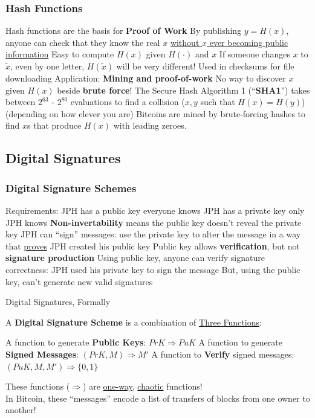 \documentclass[aspectratio=169]{beamer}
\begin{document}
\begin{frame}
\frametitle{Hash Functions}

Hash functions are the basis for \textbf{Proof of Work}
\bi
\m By publishing $y=H(x)$, anyone can check that they know the real $x$ \ul{without $x$ ever becoming public information} \pause 
\bi
\m Easy to compute $H(x)$ given $H(\cdot)$ and $x$ \pause 
\m If someone changes $x$ to $\tilde{x}$, even by one letter, $H(\tilde{x})$ will be very different!
\m Used in checksums for file downloading \pause 
\ei
\m Application: \textbf{Mining and proof-of-work}
\bi 
\m No way to discover $x$ given $H(x)$ beside \textbf{brute force}! \pause 
\m The Secure Hash Algorithm 1 (``\textbf{SHA1}'') takes between $2^{63}$ - $2^{80}$ evaluations to find a collision ($x,y$ such that $H(x)=H(y)$) (depending on how clever you are) \pause 
\m Bitcoins are mined by brute-forcing hashes to find $x$s that produce $H(x)$ with leading zeroes. 
\ei 
\ei

\end{frame}

\subsection{Digital Signatures}

\begin{frame}
\frametitle{Digital Signature Schemes}

Requirements:
\bi
\m JPH has a public key everyone knows
\m JPH has a private key only JPH knows
\bi 
\m \textbf{Non-invertability} means the public key doesn't reveal the private key \pause 
\ei 
\m JPH can ``sign'' messages: use the private key to alter the message in a way that \ul{proves} JPH created his public key 
\m Public key allows \textbf{verification}, but not \textbf{signature production} \pause 
\bi
\m Using public key, anyone can verify signature correctness: JPH used his private key to sign the message \pause 
\m But, using the public key, can't generate new valid signatures
\ei
\ei

\end{frame}


\begin{frame}{Digital Signatures, Formally}

A \textbf{Digital Signature Scheme} is a combination of \ul{Three Functions}: 

\bi 
\m A function to generate \textbf{Public Keys}: $PrK \Rightarrow PuK$ \pause 
\m A function to generate \textbf{Signed Messages}: $(PrK, M) \Rightarrow M'$ \pause 
\m A function to \textbf{Verify} signed messages: $(PuK, M, M') \Rightarrow \{0,1\}$ \pause 
\ei 

These functions ($\Rightarrow$) are \ul{one-way}, \ul{chaotic} functions! \pause \\
In Bitcoin, these ``messages'' encode a list of transfers of blocks from one owner to another! 

\end{frame}
\end{document}
